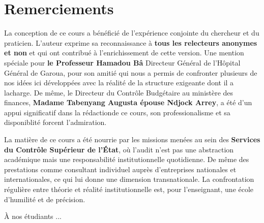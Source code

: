\documentclass[12pt, a4paper, twoside, openright]{book}
\begin{document}
\clearpage
\thispagestyle{empty}
\chapter*{Remerciements}


La conception de ce cours a bénéficié de l'expérience conjointe du chercheur et du praticien. L'auteur exprime sa reconnaissance à \textbf{tous les relecteurs anonymes et non} et qui ont contribué à l'enrichissement de cette version. 
Une mention spéciale pour \textbf{le Professeur Hamadou Bâ} Directeur Général de l'Hôpital Général de Garoua, pour son amitié qui nous a permis de confronter  plusieurs de nos idées ici développées avec la réalité de la structure exigeante dont il a lacharge. De même, le Directeur du Contrôle Budgétaire au ministère des finances, \textbf{Madame Tabenyang Augusta épouse Ndjock Arrey}, a été d'un appui significatif dans la rédactionde ce cours, son professionalisme et sa disponiblité forcent l'admiration.

La matière de ce cours a été nourrie par les missions menées au sein des \textbf{Services du Contrôle Supérieur de l'État}, où l'audit n'est pas une abstraction académique mais une responsabilité institutionnelle quotidienne. De même des prestations comme consultant individuel auprès d'entreprises nationales et internationales, ce qui lui donne une dimension transnationale. La confrontation régulière entre théorie et réalité institutionnelle est, pour l'enseignant, une école d'humilité et de précision.

À nos étudiants ...

\clearpage
\tableofcontents

\clearpage
\listoffigures
{}

\listoftables
{}
\end{document}
